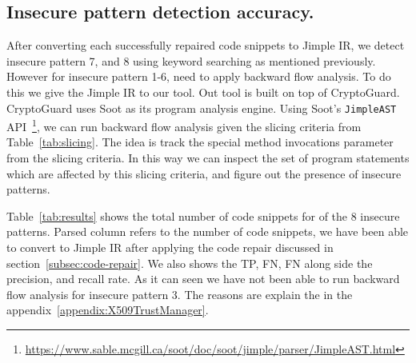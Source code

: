 \subsection{Insecure pattern detection accuracy.}
After converting each successfully repaired code snippets to Jimple IR, we detect insecure pattern 7, and 8 using keyword searching as mentioned previously. 
However for insecure pattern 1-6, need to apply backward flow analysis. To do this we give the Jimple IR to our tool. 
Out tool is built on top of CryptoGuard. 
CryptoGuard uses Soot as its program analysis engine. 
Using Soot's \texttt{JimpleAST} API~\footnote{\url{https://www.sable.mcgill.ca/soot/doc/soot/jimple/parser/JimpleAST.html}}, 
we can run backward flow analysis given the slicing criteria from Table~\ref{tab:slicing}. 
The idea is track the special method invocations parameter from the slicing criteria. 
In this way we can inspect the set of program statements which are affected 
by this slicing criteria, and figure out the presence of insecure patterns.



Table~\ref{tab:results} shows the total number of code snippets for of the 8 insecure patterns. 
Parsed column refers to the number of code snippets, we have been able to convert to Jimple IR after applying the code repair discussed 
in section~\ref{subsec:code-repair}. We also shows the TP, FN, FN along side the precision, and recall rate.
As it can seen we have not been able to run backward flow analysis for insecure pattern 3. 
The reasons are explain the in the appendix~\ref{appendix:X509TrustManager}.



